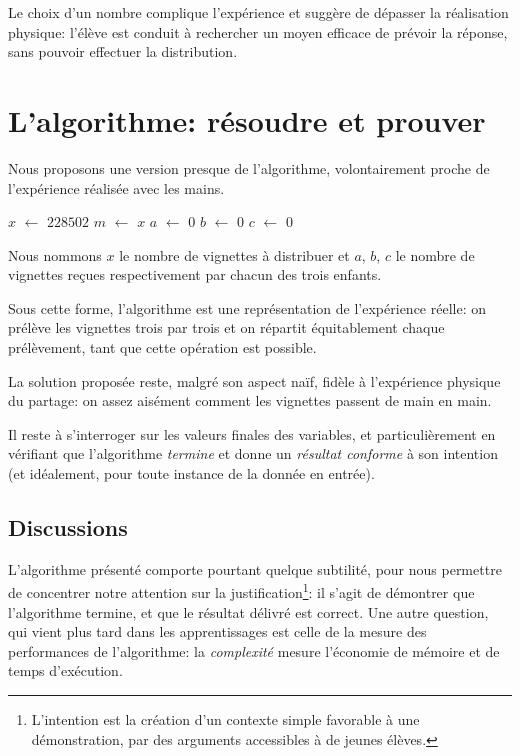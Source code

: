 Le choix d'un  nombre complique l'expérience et suggère de dépasser la réalisation physique: l'élève est conduit à rechercher un moyen efficace de prévoir la réponse, sans pouvoir effectuer la distribution. 

\section{L'algorithme: résoudre et prouver}

Nous proposons une version presque  de l'algorithme, volontairement proche de l'expérience réalisée avec les mains.

\begin{algo}
$x$ $\leftarrow$ $228502$\;
$m$ $\leftarrow$ $x$\;
$a$ $\leftarrow$ $0$\;
$b$ $\leftarrow$ $0$\;
$c$ $\leftarrow$ $0$\;
\end{algo}

Nous nommons $x$ le nombre de vignettes à distribuer et $a$, $b$, $c$ le nombre de vignettes reçues respectivement par chacun des trois enfants.

Sous cette forme, l'algorithme est une représentation de l'expérience réelle: on prélève les vignettes trois par trois et on répartit équitablement chaque prélèvement, tant que cette opération est possible.

La solution proposée reste, malgré son aspect naïf, fidèle à l'expérience physique du partage: on  assez aisément comment les vignettes passent de main en main.

Il reste à s'interroger sur les valeurs finales des variables, et particulièrement en vérifiant que l'algorithme \emph{termine} et donne un \emph{résultat conforme} à son intention (et idéalement, pour toute instance de la donnée en entrée).



\subsection{Discussions}

L'algorithme présenté comporte pourtant quelque subtilité, pour nous permettre de concentrer notre attention sur la justification\footnote{L'intention est la création d'un contexte simple favorable à une démonstration, par des arguments accessibles à de jeunes élèves.}: il s'agit de démontrer que l'algorithme termine, et que le résultat délivré est correct. Une autre question, qui vient plus tard dans les apprentissages est celle de la mesure des performances de l'algorithme: la \emph{complexité} mesure l'économie de mémoire et de temps d'exécution.

